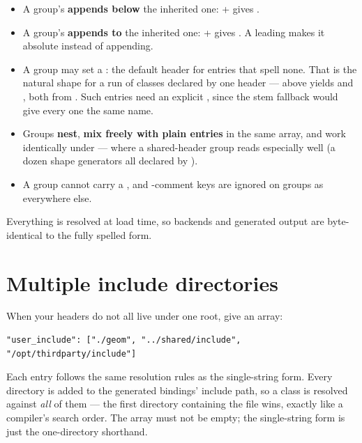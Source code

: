 \begin{itemize}
  \item A group's  \textbf{appends below} the inherited one:
     +  gives .
  \item A group's  \textbf{appends to} the inherited one:
     +  gives . A leading
    \code{::} makes it absolute instead of appending.
  \item A group may set a : the default header for entries that
    spell none. That is the natural shape for a run of classes declared by one
    header ---  above yields  and
    , both from
    . Such entries need an explicit
    , since the stem fallback would give every one the same name.
  \item Groups \textbf{nest}, \textbf{mix freely with plain entries} in the
    same array, and work identically under  --- where a
    shared-header group reads especially well (a dozen shape generators all
    declared by ).
  \item A group cannot carry a , and \code{//}-comment keys are
    ignored on groups as everywhere else.
\end{itemize}

Everything is resolved at load time, so backends and generated output are
byte-identical to the fully spelled form.

\section{Multiple include directories}

When your headers do not all live under one root, give  an
array:

\begin{lstlisting}[style=json]
"user_include": ["./geom", "../shared/include", "/opt/thirdparty/include"]
\end{lstlisting}

Each entry follows the same resolution rules as the single-string form. Every
directory is added to the generated bindings' include path, so a class
 is resolved against \emph{all} of them --- the first directory
containing the file wins, exactly like a compiler's  search order. The
array must not be empty; the single-string form is just the one-directory
shorthand.

